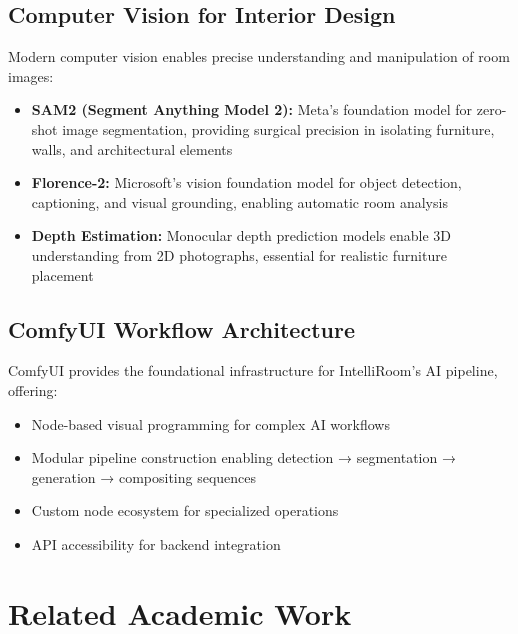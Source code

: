 \subsection{Computer Vision for Interior Design}

Modern computer vision enables precise understanding and manipulation of room images:

\begin{itemize}
    \item \textbf{SAM2 (Segment Anything Model 2):} Meta's foundation model for zero-shot image segmentation, providing surgical precision in isolating furniture, walls, and architectural elements \cite{kirillov2023segment}
    
    \item \textbf{Florence-2:} Microsoft's vision foundation model for object detection, captioning, and visual grounding, enabling automatic room analysis \cite{yuan2024florence}
    
    \item \textbf{Depth Estimation:} Monocular depth prediction models enable 3D understanding from 2D photographs, essential for realistic furniture placement
\end{itemize}

\subsection{ComfyUI Workflow Architecture}

ComfyUI provides the foundational infrastructure for IntelliRoom's AI pipeline, offering:

\begin{itemize}
    \item Node-based visual programming for complex AI workflows
    \item Modular pipeline construction enabling detection → segmentation → generation → compositing sequences
    \item Custom node ecosystem for specialized operations
    \item API accessibility for backend integration
\end{itemize}

\section{Related Academic Work}
\label{sec:related_work}

